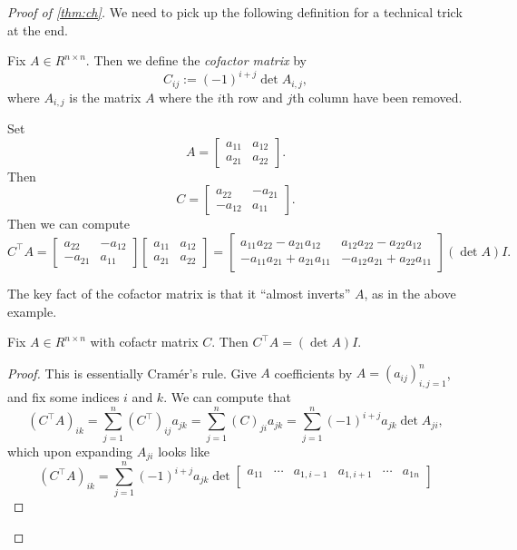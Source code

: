 \begin{proof}[Proof of \autoref{thm:ch}]
	We need to pick up the following definition for a technical trick at the end.
	\begin{definition}
		Fix $A\in R^{n\times n}$. Then we define the \textit{cofactor matrix} by
		\[C_{ij}:=(-1)^{i+j}\det A_{i,j},\]
		where $A_{i,j}$ is the matrix $A$ where the $i$th row and $j$th column have been removed.
	\end{definition}
	\begin{example}
		Set
		\[A=\begin{bmatrix}
			a_{11} & a_{12} \\
			a_{21} & a_{22}
		\end{bmatrix}.\]
		Then
		\[C=\begin{bmatrix}
			a_{22} & -a_{21} \\
			-a_{12} & a_{11}
		\end{bmatrix}.\]
		Then we can compute
		\[C^\intercal A=\begin{bmatrix}
			a_{22} & -a_{12} \\
			-a_{21} & a_{11}
		\end{bmatrix}\begin{bmatrix}
			a_{11} & a_{12} \\
			a_{21} & a_{22}
		\end{bmatrix}=\begin{bmatrix}
			a_{11}a_{22}-a_{21}a_{12} & a_{12}a_{22}-a_{22}a_{12} \\
			-a_{11}a_{21}+a_{21}a_{11} & -a_{12}a_{21}+a_{22}a_{11}
		\end{bmatrix}(\det A)I.\]
	\end{example}
	The key fact of the cofactor matrix is that it ``almost inverts'' $A$, as in the above example.
	\begin{lemma} \label{lem:adjugate}
		Fix $A\in R^{n\times n}$ with cofactr matrix $C$. Then $C^\intercal A=(\det A)I$.
	\end{lemma}
	\begin{proof}
		This is essentially Cram\'er's rule. Give $A$ coefficients by $A=(a_{ij})_{i,j=1}^n$, and fix some indices $i$ and $k$. We can compute that
		\[\left(C^\intercal A\right)_{ik}=\sum_{j=1}^n\left(C^\intercal\right)_{ij}a_{jk}=\sum_{j=1}^n(C)_{ji}a_{jk}=\sum_{j=1}^n(-1)^{i+j}a_{jk}\det A_{ji},\]
		which upon expanding $A_{ji}$ looks like
		\[\left(C^\intercal A\right)_{ik}=\sum_{j=1}^n(-1)^{i+j}a_{jk}\det\begin{bmatrix}
			a_{11} & \cdots & a_{1,i-1} & a_{1,i+1} & \cdots & a_{1n} \\

\end{bmatrix}\]
\end{proof}
\end{proof}
